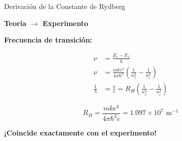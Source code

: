 \documentclass[12pt,aspectratio=169]{beamer}
\begin{document}
\begin{frame}{Derivación de la Constante de Rydberg}
    \begin{center}
        \huge \textbf{Teoría $\rightarrow$ Experimento}
    \end{center}
    
    \vspace{1cm}
    \begin{center}
        \Large \textbf{Frecuencia de transición:}
    \end{center}
    
    \vspace{0.5cm}
    \begin{align}
        \nu &= \frac{E_i - E_f}{h} \\[0.5cm]
        \nu &= \frac{mke^4}{4\pi\hbar^3} \left(\frac{1}{n_f^2} - \frac{1}{n_i^2}\right) \\[0.5cm]
        \frac{1}{\lambda} &= \frac{\nu}{c} = R_H \left(\frac{1}{n_f^2} - \frac{1}{n_i^2}\right)
    \end{align}
    
    \vspace{1cm}
    \begin{center}
        \colorbox{verdeclaro!20}{\parbox{0.9\textwidth}{
            \begin{center}
                \LARGE $$R_H = \frac{mke^4}{4\pi\hbar^3c} = 1.097 \times 10^7 \text{ m}^{-1}$$
            \end{center}
        }}
    \end{center}
    
    \vspace{0.5cm}
    \begin{center}
        \LARGE \textcolor{azuloscuro}{\textbf{¡Coincide exactamente con el experimento!}}
    \end{center}
\end{frame}
\end{document}

